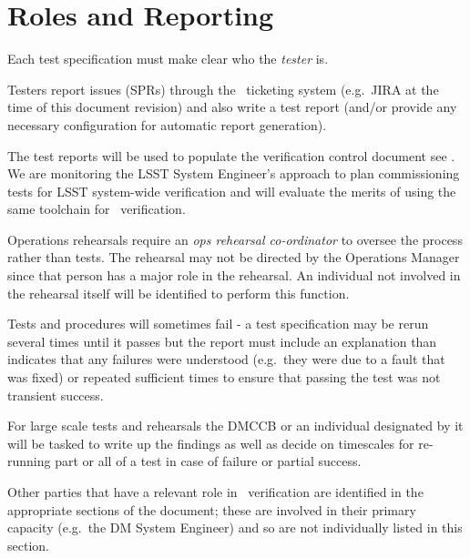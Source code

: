 

\section{Roles and Reporting}

Each test specification must make clear who the {\em tester} is.

Testers report issues (SPRs) through the \product\ ticketing system (e.g.\ JIRA at the time of this document revision) and also write a test report (and/or provide any necessary configuration for automatic report generation).

The test reports will be used to populate the verification control document see . We are monitoring the LSST System Engineer's approach to plan commissioning tests for LSST system-wide verification and will evaluate the merits of using the same toolchain for \product\ verification.

Operations rehearsals require an {\em ops rehearsal co-ordinator} to oversee the process rather than tests. The rehearsal may not be directed by the Operations Manager since that person has a major role in the rehearsal. An individual not involved in the rehearsal itself will be identified to perform this function.

Tests and procedures will sometimes fail - a test specification may be rerun several times until it passes but the report must include an explanation than indicates that any failures were understood (e.g.\ they were due to a fault that was fixed) or repeated sufficient times to ensure that passing the test was not transient success.

For large scale tests and rehearsals the DMCCB or an individual designated by it will be tasked to write up the findings as well as decide on timescales for re-running part or all of a test in case of failure or partial success.

Other parties that have a relevant role in \product\ verification are identified in the appropriate sections of the document; these are involved in their primary capacity (e.g.\ the DM System Engineer) and so are not individually listed in this section.